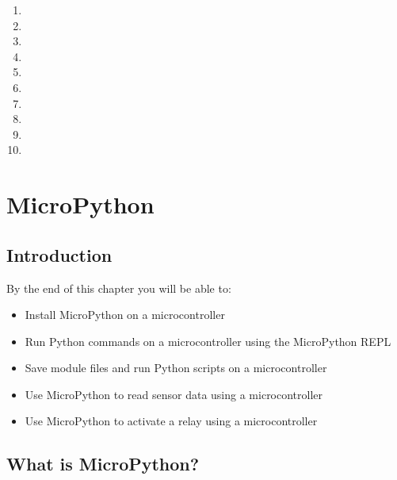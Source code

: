 \documentclass{book}
\begin{document}
    
        \begin{enumerate}
\def\labelenumi{\arabic{enumi}.}
\item
\item
\item
\item
\item
\item
\item
\item
\item
\item
\end{enumerate}
    




    
        \chapter{MicroPython}\label{micropython}
    




    
        \section{Introduction}\label{introduction}
    




    
        By the end of this chapter you will be able to:

\begin{itemize}
\item
  Install MicroPython on a microcontroller
\item
  Run Python commands on a microcontroller using the MicroPython REPL
\item
  Save module files and run Python scripts on a microcontroller
\item
  Use MicroPython to read sensor data using a microcontroller
\item
  Use MicroPython to activate a relay using a microcontroller
\end{itemize}
    




    
        \section{What is MicroPython?}\label{what-is-micropython}
    
\end{document}
